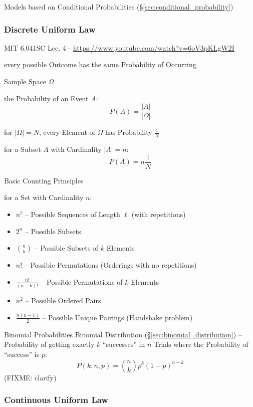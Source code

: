 Models based on Conditional Probabilities (\S\ref{sec:conditional_probability})



\subsubsection{Discrete Uniform Law}\label{sec:discrete_uniform_law}

MIT 6.041SC Lec. 4 - \url{https://www.youtube.com/watch?v=6oV3pKLgW2I}

every possible Outcome has the same Probability of Occurring

Sample Space $\Omega$

the Probability of an Event $A$:
\[
  P(A) = \frac{|A|}{|\Omega|}
\]

for $|\Omega| = N$, every Element of $\Omega$ has Probability $\frac{1}{N}$

for a Subset $A$ with Cardinality $|A| = n$:
\[
  P(A) = n \frac{1}{N}
\]


Basic Counting Principles

for a Set with Cardinality $n$:
\begin{itemize}
  \item $n^\ell$ -- Possible Sequences of Length $\ell$ (with repetitions)
  \item $2^n$ -- Possible Subsets
  \item $\binom{n}{k}$ -- Possible Subsets of $k$ Elements
  \item $n!$ -- Possible Permutations (Orderings with no repetitions)
  \item $\frac{n!}{(n-k)!}$ -- Possible Permutations of $k$ Elements
  \item $n^2$ -- Possible Ordered Pairs
  \item $\frac{n(n-1)}{2}$ -- Possible Unique Pairings (Handshake problem)
\end{itemize}


Binomial Probabilities \fist Binomial Distribution
(\S\ref{sec:binomial_distribution}) -- Probability of getting exactly $k$
``successes'' in $n$ Trials where the Probability of ``success'' is $p$:
\[
  P(k,n,p) = \binom{n}{k}p^k(1-p)^{n-k}
\]
(FIXME: clarify)



\subsubsection{Continuous Uniform Law}\label{sec:continuous_uniform_law}

